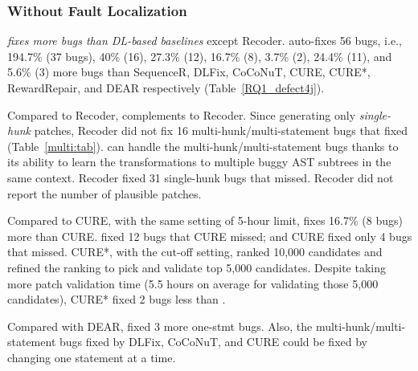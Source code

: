\subsubsection{{\bf Without Fault Localization}}

{\em {\tool} fixes more bugs than DL-based baselines} except
Recoder. {\tool} auto-fixes 56 bugs, i.e., 194.7\% (37 bugs), 40\%
(16), 27.3\% (12), 16.7\% (8), 3.7\% (2), 24.4\% (11), and 5.6\% (3) more bugs than
SequenceR, DLFix, CoCoNuT, CURE, CURE*, RewardRepair, and DEAR respectively
(Table~\ref{RQ1_defect4j}).

Compared to Recoder, {\tool} complements to Recoder. Since generating
only {\em single-hunk} patches, Recoder did not fix 16
multi-hunk/multi-statement bugs that {\tool} fixed (Table~\ref{multi:tab}).
{\tool} can handle the multi-hunk/multi-statement bugs
thanks to its ability to learn the transformations to multiple buggy
AST subtrees in the same context.
%
Recoder fixed 31 single-hunk bugs that {\tool} missed. Recoder did not
report the number of plausible patches.


Compared to CURE, with the same setting of 5-hour limit, {\tool} fixes
16.7\% (8 bugs) more than CURE. {\tool} fixed 12 bugs that
CURE missed; and CURE fixed only 4 bugs that {\tool} missed.
%
CURE*, with the cut-off setting, ranked 10,000 candidates and refined
the ranking to pick and validate top 5,000 candidates. Despite taking
more patch validation time (5.5 hours on average for
validating those 5,000 candidates), CURE* fixed 2 bugs less than
{\tool}.

Compared with DEAR, {\tool} fixed 3 more one-stmt bugs. Also, the
multi-hunk/multi-statement bugs fixed by DLFix, CoCoNuT, and CURE
could be fixed by changing one statement at a time.


